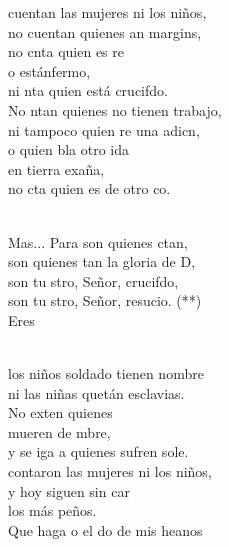 \documentclass[12pt]{article}
\begin{document}
\begin{multicols*}{2}
\begin{cancion}%
	cuentan las mujeres ni los niños,\\
	no cuentan quienes an margins,\\
	no cnta quien es re \\
	o estánfermo,\\
	ni nta quien está crucifdo.\\
	No ntan quienes no tienen trabajo,\\
	ni tampoco quien re una adicn, \\
	o quien bla otro ida \\
	en tierra exaña,\\
	no cta quien es de otro co.\\\jump\\
	\begin{chorus}%
	Mas... Para  son quienes ctan,\\
	son quienes tan la gloria de D,\\
	son tu stro, Señor, crucifdo,\\
	son tu stro, Señor, resucio. (**)\\
	Eres  \\
	\end{chorus}%
	\jump\\
	los niños soldado tienen nombre\\
	ni las niñas quetán esclavias.\\
	No exten quienes \\
	 mueren de mbre,\\
	y se iga a quienes sufren sole.\\
	contaron las mujeres ni los niños,\\
	y hoy siguen sin car \\
	los más peños.\\
	Que haga o el do de mis heanos \\

\end{cancion}
\end{multicols*}
\end{document}
